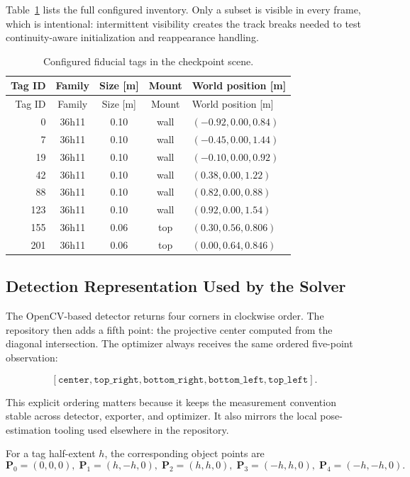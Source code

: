 \documentclass[11pt,a4paper]{article}
\begin{document}
Table~\ref{tab:tags} lists the full configured inventory.
Only a subset is visible in every frame, which is intentional: intermittent visibility creates the track breaks needed to test continuity-aware initialization and reappearance handling.

\begin{longtable}{rcccl}
\caption{Configured fiducial tags in the checkpoint scene.}
\label{tab:tags}\\
\toprule
Tag ID & Family & Size [m] & Mount & World position [m] \\
\midrule
\endfirsthead
\toprule
Tag ID & Family & Size [m] & Mount & World position [m] \\
\midrule
\endhead
0   & 36h11 & 0.10 & wall & $(-0.92, 0.00, 0.84)$ \\
7   & 36h11 & 0.10 & wall & $(-0.45, 0.00, 1.44)$ \\
19  & 36h11 & 0.10 & wall & $(-0.10, 0.00, 0.92)$ \\
42  & 36h11 & 0.10 & wall & $( 0.38, 0.00, 1.22)$ \\
88  & 36h11 & 0.10 & wall & $( 0.82, 0.00, 0.88)$ \\
123 & 36h11 & 0.10 & wall & $( 0.92, 0.00, 1.54)$ \\
155 & 36h11 & 0.06 & top  & $( 0.30, 0.56, 0.806)$ \\
201 & 36h11 & 0.06 & top  & $( 0.00, 0.64, 0.846)$ \\
\bottomrule
\end{longtable}

\subsection{Detection Representation Used by the Solver}

The OpenCV-based detector returns four corners in clockwise order.
The repository then adds a fifth point: the projective center computed from the diagonal intersection.
The optimizer always receives the same ordered five-point observation:

\[
\left[\texttt{center}, \texttt{top\_right}, \texttt{bottom\_right}, \texttt{bottom\_left}, \texttt{top\_left}\right].
\]

This explicit ordering matters because it keeps the measurement convention stable across detector, exporter, and optimizer.
It also mirrors the local pose-estimation tooling used elsewhere in the repository.

For a tag half-extent $h$, the corresponding object points are
\[
\mathbf{P}_0=(0,0,0),\;
\mathbf{P}_1=(h,-h,0),\;
\mathbf{P}_2=(h,h,0),\;
\mathbf{P}_3=(-h,h,0),\;
\mathbf{P}_4=(-h,-h,0).
\]
\end{document}
